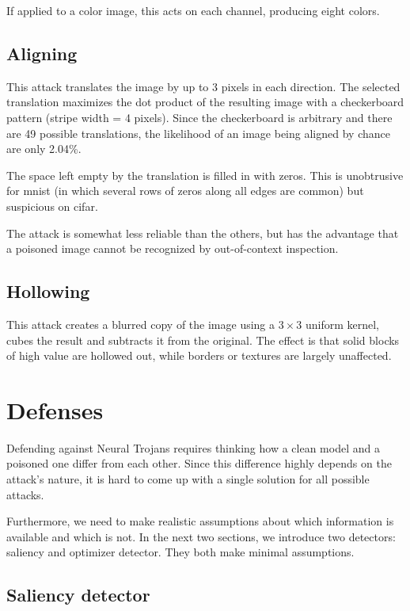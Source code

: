 \documentclass[letterpaper, 10 pt, conference]{ieeeconf}  %
\begin{document}
If applied to a color image, this acts on each channel, producing
eight colors.


\subsection{Aligning}

This attack translates the image by up to 3 pixels in each direction.
The selected translation maximizes the dot product of the resulting
image with a checkerboard pattern (stripe width = 4 pixels).  Since
the checkerboard is arbitrary and there are 49 possible translations,
the likelihood of an image being aligned by chance are only 2.04\%.

The space left empty by the translation is filled in with zeros.  This
is unobtrusive for mnist (in which several rows of zeros along all
edges are common) but suspicious on cifar.

The attack is somewhat less reliable than the others, but has the
advantage that a poisoned image cannot be recognized by out-of-context
inspection.

\subsection{Hollowing}

This attack creates a blurred copy of the image using a $3\times 3$
uniform kernel, cubes the result and subtracts it from the original.
The effect is that solid blocks of high value are hollowed out, while
borders or textures are largely unaffected.


\section{Defenses}

Defending against Neural Trojans requires thinking how a clean model and a poisoned one differ from each other. Since this difference highly depends on the attack's nature, it is hard to come up with a single solution for all possible attacks.

Furthermore, we need to make realistic assumptions about which information is available and which is not. In the next two sections, we introduce two detectors: saliency and optimizer detector. They both make minimal assumptions.

\subsection{Saliency detector}
\end{document}

